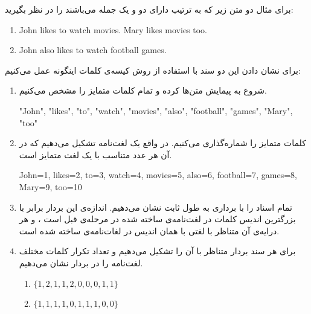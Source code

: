 برای مثال دو متن زیر که به ترتیب دارای دو و یک جمله می‌باشند را در نظر بگیرید:


\begin{latin}
\begin{enumerate}
	\item John likes to watch movies. Mary likes movies too.
	\item John also likes to watch football games.
\end{enumerate}
\end{latin}
\vspace{-0.4cm}

برای نشان دادن این دو سند با استفاده از روش کیسه‌ی‌ کلمات اینگونه عمل می‌‌کنیم:
\vspace{-0.4cm}
\begin{enumerate}
	
	\item  شروع به پیمایش متن‌ها کرده و تمام کلمات متمایز را مشخص می‌کنیم.
	\vspace{0.1cm}
	\begin{latin}
		"John", "likes", "to", "watch", "movies", "also", "football", "games", "Mary", "too"
	\end{latin}
	\vspace{-0.4cm}
	
	\item کلمات متمایز را شماره‌گذاری می‌‌کنیم. در واقع یک لغت‌نامه تشکیل می‌‌دهیم که در آن هر عدد متناسب با یک لغت متمایز است.
	\vspace{0.1cm}
	\begin{latin}
		John=1, likes=2, to=3, watch=4, movies=5, also=6, football=7, games=8, Mary=9, too=10
	\end{latin}
	\vspace{-0.4cm}
	
	\item تمام اسناد را با برداری به طول ثابت نشان می‌‌دهیم. اندازه‌ی  این بردار برابر با بزرگترین اندیس کلمات در لغت‌نامه‌ی ساخته شده در مرحله‌ی قبل است ، و هر درایه‌ی آن متناظر با لغتی با همان اندیس در لغات‌نامه‌ی ساخته شده است.
	
	\item برای هر سند بردار متناظر با آن را تشکیل می‌‌دهیم و تعداد تکرار کلمات مختلف لغت‌نامه را در بردار نشان می‌‌دهیم.
	\vspace{0.1cm}
	\begin{latin}
		\begin{enumerate}
			\item $\{1, 2, 1, 1, 2, 0, 0, 0, 1, 1\}$
			\item $\{1, 1, 1, 1, 0, 1, 1, 1, 0, 0\}$
		\end{enumerate}
	\end{latin}
	\vspace{-0.4cm}
		
\end{enumerate}

